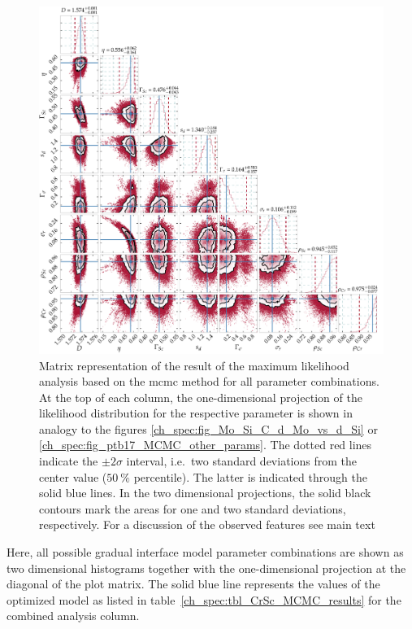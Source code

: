 \begin{figure}[htbp]
  \centering
  \includegraphics[width=\textwidth]{img/CrSc_cornerplot_combined}
  \caption{Matrix representation of the result of the maximum likelihood analysis based on the \gls{mcmc} method for all parameter combinations. At the top of each column, the one-dimensional projection of the likelihood distribution for the respective parameter is shown in analogy to the figures \ref{ch_spec:fig_Mo_Si_C_d_Mo_vs_d_Si} or \ref{ch_spec:fig_ptb17_MCMC_other_params}. The dotted red lines indicate the $\pm 2 \sigma$ interval, i.e.~two standard deviations from the center value ($\SI{50}{\percent}$ percentile). The latter is indicated through the solid blue lines. In the two dimensional projections, the solid black contours mark the areas for one and two standard deviations, respectively. For a discussion of the observed features see main text}
  \label{ch_spec:fig_CrSc_cornerplot_combined}
\end{figure}
Here, all possible gradual interface model parameter combinations are shown as two dimensional histograms together with the one-dimensional projection at the diagonal of the plot matrix. The solid blue line represents the values of the optimized model as listed in table~\ref{ch_spec:tbl_CrSc_MCMC_results} for the combined analysis column.

